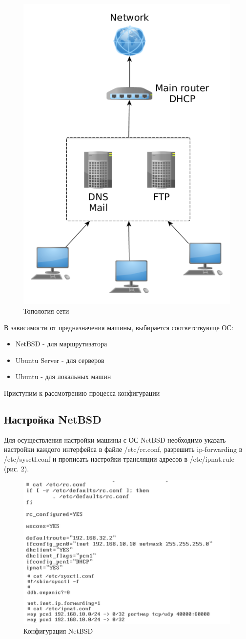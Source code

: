 \begin{figure}[H]
	\begin{center}
		\includegraphics[width=0.6\linewidth]{pics/topology}
		\caption{Топология сети}
		\label{fig:topology}
	\end{center}
\end{figure}

В зависимости от предназначения машины, выбирается соответствующе ОС:
\begin{itemize}
\item NetBSD - для маршрутизатора
\item Ubuntu Server - для серверов
\item Ubuntu - для локальных машин
\end{itemize}

Приступим к рассмотрению процесса конфигурации

\subsection{Настройка NetBSD}
Для осуществления настройки машины с ОС NetBSD необходимо указать настройки каждого интерфейса в файле /etc/rc.conf, разрешить ip-forwarding в /etc/sysctl.conf и прописать настройки трансляции адресов в /etc/ipnat.rule (рис. 2). 

\begin{figure}[H]
	\begin{center}
		\includegraphics[width=0.6\linewidth]{pics/netBSD}
		\caption{Конфигурация NetBSD}
		\label{fig:NetBsd}
	\end{center}
\end{figure}

